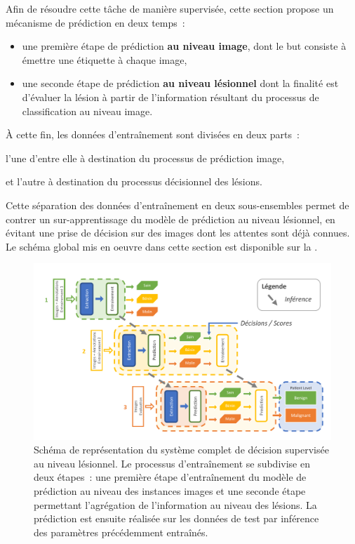 Afin de résoudre cette tâche de manière supervisée, cette section propose un mécanisme de prédiction en deux temps~: 
\begin{itemize}
    \item une première étape de prédiction \textbf{au niveau image}, dont le but consiste à émettre une étiquette à chaque image,
    \item une seconde étape de prédiction \textbf{au niveau lésionnel} dont la finalité est d'évaluer la lésion à partir de l'information résultant du processus de classification au niveau image.
\end{itemize} À cette fin, les données d'entraînement sont divisées en deux parts~:
\begin{inlinerate}
    \item l'une d'entre elle à destination du processus de prédiction image,
    \item et l'autre à destination du processus décisionnel des lésions.
\end{inlinerate}
Cette séparation des données d'entraînement en deux sous-ensembles permet de contrer un sur-apprentissage du modèle de prédiction au niveau lésionnel, en évitant une prise de décision sur des images dont les attentes sont déjà connues. Le schéma global mis en oeuvre dans cette section est disponible sur la .\par

\begin{figure}[H]
    \centering
    \includegraphics[width=0.95\linewidth]{contents/chapter_7/resources/scheme_patient_decision.pdf}
    \caption{Schéma de représentation du système complet de décision supervisée au niveau lésionnel. Le processus d'entraînement se subdivise en deux étapes~: une première étape d'entraînement du modèle de prédiction au niveau des instances images et une seconde étape permettant l'agrégation de l'information au niveau des lésions. La prédiction est ensuite réalisée sur les données de test par inférence des paramètres précédemment entraînés.}
    \label{fig:scheme_patient_decision}
\end{figure}\par

